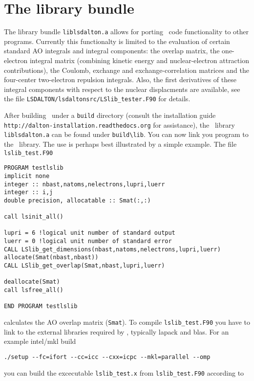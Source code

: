 \section{The {\lsdalton} library bundle}
\label{sec:LSlib}

The {\lsdalton} library bundle \verb|liblsdalton.a| allows for porting \lsdalton\ code 
functionality to other programs. Currently this functionalty is limited to 
the evaluation of certain standard AO integrals and integral components: the overlap 
matrix, the one-electron integral matrix (combining kinetic energy and 
nuclear-electron attraction contributions), the Coulomb, exchange and exchange-correlation 
matrices and the four-center two-electron repulsion integrals. Also, the 
first derivatives of these integral components with respect to the nuclear displacments 
are available, see the file \verb|LSDALTON/lsdaltonsrc/LSlib_tester.F90|
for details. 

After building \lsdalton\ under a \verb|build| directory (consult the installation guide
\verb|http://dalton-installation.readthedocs.org| for assistance), the \lsdalton\ library 
\verb|liblsdalton.a| can be found under \verb|build\lib|. You can now link you 
program to the \lsdalton\ library. 
The use is perhaps best illustrated by a simple example. The file \verb|lslib_test.F90|

\begin{verbatim}
PROGRAM testlslib
implicit none
integer :: nbast,natoms,nelectrons,lupri,luerr
integer :: i,j
double precision, allocatable :: Smat(:,:)

call lsinit_all()

lupri = 6 !logical unit number of standard output
luerr = 0 !logical unit number of standard error
CALL LSlib_get_dimensions(nbast,natoms,nelectrons,lupri,luerr)
allocate(Smat(nbast,nbast))
CALL LSlib_get_overlap(Smat,nbast,lupri,luerr)

deallocate(Smat)
call lsfree_all()

END PROGRAM testlslib
\end{verbatim}
%
calculates the AO overlap matrix (\verb|Smat|). To compile \verb|lslib_test.F90|
you have to link to the external libraries required by \lsdalton, typically lapack
and blas. For an example intel/mkl build

\begin{verbatim}
./setup --fc=ifort --cc=icc --cxx=icpc --mkl=parallel --omp
\end{verbatim}
%
you can build the excecutable \verb|lslib_test.x| from \verb|lslib_test.F90| according to


